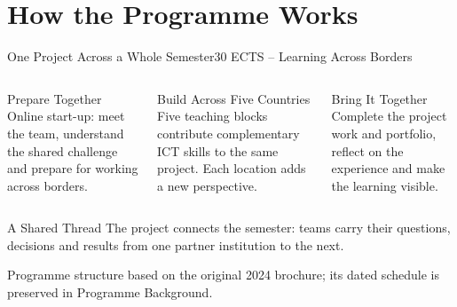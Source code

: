 \part[nopartpage]{How the Programme Works}

\begin{frame}{One Project Across a Whole Semester}{30 ECTS -- Learning Across Borders}
\begin{columns}[T,onlytextwidth]
\begin{block}{Prepare Together}
Online start-up: meet the team, understand the shared challenge and prepare for working across borders.
\end{block}
\begin{block}{Build Across Five Countries}
Five teaching blocks contribute complementary ICT skills to the same project. Each location adds a new perspective.
\end{block}
\begin{block}{Bring It Together}
Complete the project work and portfolio, reflect on the experience and make the learning visible.
\end{block}
\end{columns}
\vspace{1em}
\begin{alertblock}{A Shared Thread}
The project connects the semester: teams carry their questions, decisions and results from one partner institution to the next.
\end{alertblock}
\vfill
{\scriptsize Programme structure based on the original 2024 brochure; its dated schedule is preserved in Programme Background.}
\end{frame}

